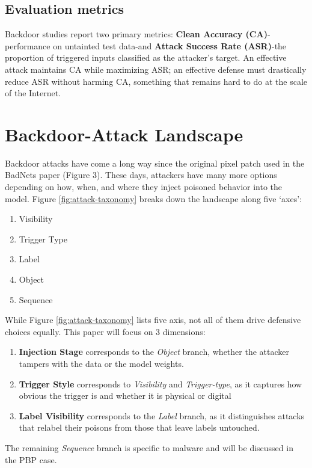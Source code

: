 \documentclass[sigconf,authorversion,nonacm,balance=false]{acmart}
\begin{document}
\subsection{Evaluation metrics}
Backdoor studies report two primary metrics:  
\textbf{Clean Accuracy (CA)}-performance on untainted test data-and  
\textbf{Attack Success Rate (ASR)}-the proportion of triggered inputs classified as the attacker’s target\cite{attack_defense_wang_2023}.  
An effective attack maintains CA while maximizing ASR; an effective defense must drastically reduce ASR without harming CA, something that remains hard to do at the scale of the Internet\cite{defense_shamshiri_2024,defense_malware_nguyen_2025}.

\section{Backdoor-Attack Landscape}
\label{sec:attacks}
Backdoor attacks have come a long way since the original pixel patch used in the BadNets paper (Figure 3). These days, attackers have many more options depending on how, when, and where they inject poisoned behavior into the model. Figure \ref{fig:attack-taxonomy} breaks down the landscape along five `axes’:
\begin{enumerate}
    \item Visibility
    \item Trigger Type
    \item Label
    \item Object
    \item Sequence
\end{enumerate}

While Figure \ref{fig:attack-taxonomy} lists five axis, not all of them drive defensive choices equally. This paper will focus on 3 dimensions:
\begin{enumerate}
    \item \textbf{Injection Stage} corresponds to the \textit{Object} branch, whether the attacker tampers with the data or the model weights.
    \item \textbf{Trigger Style} corresponds to \textit{Visibility} and \textit{Trigger-type}, as it captures how obvious the trigger is and whether it is physical or digital
    \item \textbf{Label Visibility} corresponds to the \textit{Label} branch, as it distinguishes attacks that relabel their poisons from those that leave labels untouched.
\end{enumerate}
The remaining \textit{Sequence} branch is specific to malware and will be discussed in the PBP case.
\end{document}
